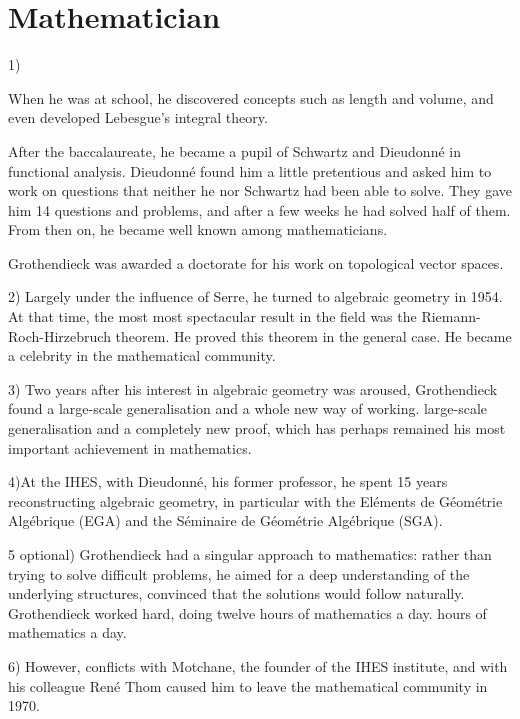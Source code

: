 \documentclass[12pt]{article}
\begin{document}
\section{Mathematician}
\label{br}


1) 

When he was at school, he discovered concepts
such as length and volume, and even developed Lebesgue's integral theory.

After the baccalaureate, he became a pupil of Schwartz and Dieudonné in functional analysis. Dieudonné found him a little pretentious and asked him to work on questions that neither he nor Schwartz had been able to solve. 
They gave him 14 questions and problems, and after a few weeks he had solved half of them.
From then on, he became well known among mathematicians.

Grothendieck was awarded a doctorate for his work on topological vector spaces.



2) Largely under the influence of Serre, he turned to algebraic geometry in 1954.  At that time, the most 
 most spectacular result in the field was the Riemann-Roch-Hirzebruch theorem. He proved this theorem in the general case. He became a celebrity in the mathematical community.

3) Two years after his interest in algebraic geometry was aroused, Grothendieck found a large-scale generalisation and a whole new way of working.
large-scale generalisation and a completely new proof, which has perhaps remained his most important 
achievement in mathematics.


4)At the IHES, with Dieudonné, his former professor, he spent 15 years reconstructing algebraic geometry, in particular with the Eléments de Géométrie Algébrique (EGA) and the Séminaire de Géométrie Algébrique (SGA).

5 optional) Grothendieck had a singular approach to mathematics: rather than trying to solve difficult problems, he aimed for a deep understanding of the underlying structures, convinced that the solutions would follow naturally.
Grothendieck worked hard, doing twelve hours of mathematics a day. hours of mathematics a day.


6) However, conflicts with Motchane, the founder of the IHES institute, and with his colleague René Thom caused him to leave the mathematical community in 1970.
\end{document}
